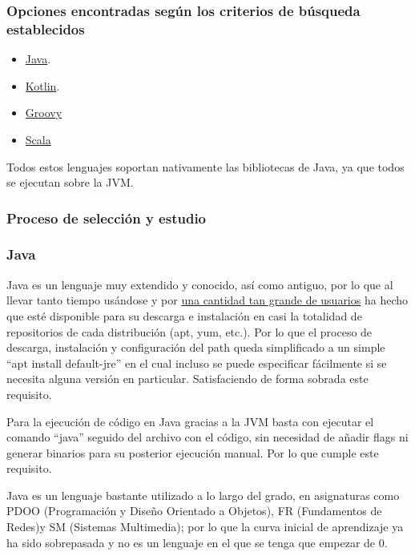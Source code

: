 \subsubsection{Opciones encontradas según los criterios de búsqueda establecidos}

\begin{itemize}
    \item \href{https://www.java.com/es/}{Java}.
    \item \href{https://kotlinlang.org/}{Kotlin}.
    \item \href{https://groovy-lang.org/}{Groovy}
    \item \href{https://www.scala-lang.org/}{Scala}
\end{itemize}

Todos estos lenguajes soportan nativamente las bibliotecas de Java, ya que todos
se ejecutan sobre la JVM.

\subsubsection{Proceso de selección y estudio}

\subsubsection{Java}

\begin{todolist}
    \item[\xcmark] Java es un lenguaje muy extendido y conocido, así como
    antiguo, por lo que al llevar tanto tiempo usándose y por
    \href{https://www.stackscale.com/es/blog/lenguajes-programacion-mas-populares/}{una
    cantidad tan grande de usuarios} ha hecho que esté disponible para su
    descarga e instalación en casi la totalidad de repositorios de cada
    distribución (apt, yum, etc.). Por lo que el proceso de descarga, instalación
    y configuración del path queda simplificado a un simple ``apt install
    default-jre'' en el cual incluso se puede especificar fácilmente si se
    necesita alguna versión en particular. Satisfaciendo de forma sobrada este
    requisito.
    \item[\xcmark] Para la ejecución de código en Java gracias a la JVM basta
    con ejecutar el comando ``java'' seguido del archivo con el código, sin
    necesidad de añadir flags ni generar binarios para su posterior ejecución
    manual. Por lo que cumple este requisito.
    \item[\xcmark] Java es un lenguaje bastante utilizado a lo largo del grado,
    en asignaturas como PDOO (Programación y Diseño Orientado a Objetos), FR
    (Fundamentos de Redes)y SM (Sistemas Multimedia); por lo que la curva
    inicial de aprendizaje ya ha sido sobrepasada y no es un lenguaje en el que
    se tenga que empezar de 0.
\end{todolist}

